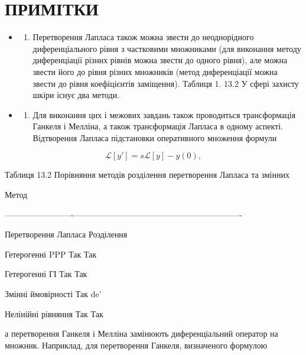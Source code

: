 \documentclass[
  ukrainian,
]{article}
\providecommand{\tightlist}{%
  \setlength{\itemsep}{0pt}\setlength{\parskip}{0pt}}
\begin{document}
\section{ПРИМІТКИ}\label{ux43fux440ux438ux43cux456ux442ux43aux438}

\begin{itemize}
\tightlist
\item
  \begin{enumerate}
  \def\labelenumi{\arabic{enumi}.}
  \tightlist
  \item
    Перетворення Лапласа також можна звести до неоднорідного
    диференціального рівня з частковими множниками (для виконання методу
    диференціації різних рівнів можна звести до одного рівня), але можна
    звести його до рівня різних множників (метод диференціації можна
    звести до рівня коефіцієнтів заміщення). Таблиця 1. 13.2 У сфері
    захисту шкіри існує два методи.
  \end{enumerate}
\item
  \begin{enumerate}
  \def\labelenumi{\arabic{enumi}.}
  \setcounter{enumi}{1}
  \tightlist
  \item
    Для виконання цих і межових завдань також проводиться трансформація
    Ганкеля і Мелліна, а також трансформація Лапласа в одному аспекті.
    Відтворення Лапласа підстановки оперативного множення формули
  \end{enumerate}
\end{itemize}

\[
\mathscr{L}[y'] = s\mathscr{L}[y] - y(0),
\]

Таблиця 13.2 Порівняння методів розділення перетворення Лапласа та
змінних

\textbar{} Метод \textbar{} \textbar{}

\textbar-------------------------\textbar---------------------------\textbar----------------------------------\textbar{}

\textbar{} Перетворення Лапласа \textbar{} Розділення \textbar{}

Гетерогенні PPP \textbar{} Так \textbar{} Так \textbar{}

Гетерогенні ГІ \textbar{} Так \textbar{} Так \textbar{}

Змінні ймовірності \textbar{} Так \textbar{} de' \textbar{}

Нелінійні рівняння \textbar{} Так \textbar{} Так \textbar{}

а перетворення Ганкеля і Мелліна замінюють диференціальний оператор на
множник. Наприклад, для перетворення Ганкеля, визначеного формулою
\end{document}
